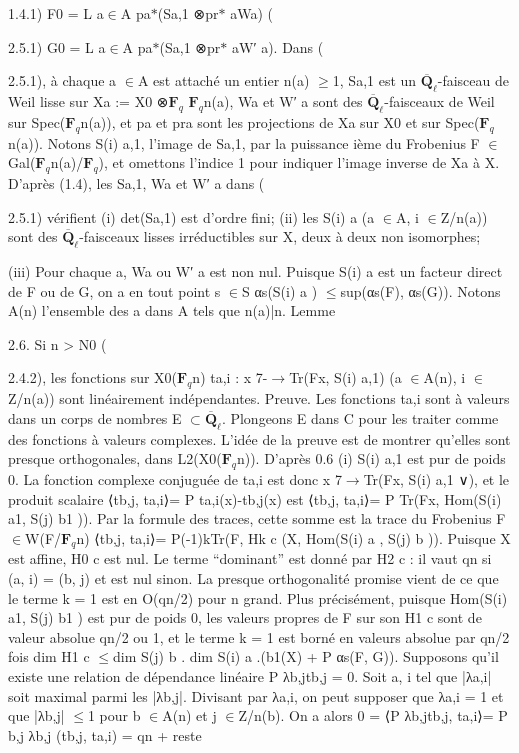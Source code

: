 \documentclass[11pt]{article}
\begin{document}
1.4.1) F0 = L a\(\in\)A pa\(*\)(Sa,1 ⊗pr\(*\) aWa) (

2.5.1) G0 = L a\(\in\)A pa\(*\)(Sa,1 ⊗pr\(*\) aW′ a). Dans (

2.5.1), à chaque a \(\in\)A est attaché un entier n(a) \(\ge\)1, Sa,1 est un \(\overline{\mathbf Q}_\ell\)-faisceau de Weil lisse sur Xa := X0 ⊗\(\mathbf F_q\) \(\mathbf F_q\)n(a), Wa et W′ a sont des \(\overline{\mathbf Q}_\ell\)-faisceaux de Weil sur Spec(\(\mathbf F_q\)n(a)), et pa et pra sont les projections de Xa sur X0 et sur Spec(\(\mathbf F_q\)n(a)). Notons S(i) a,1, l’image de Sa,1, par la puissance ième du Frobenius F \(\in\)Gal(\(\mathbf F_q\)n(a)/\(\mathbf F_q\)), et omettons l’indice 1 pour indiquer l’image inverse de Xa à X. D’après (1.4), les Sa,1, Wa et W′ a dans (

2.5.1) vérifient (i) det(Sa,1) est d’ordre fini; (ii) les S(i) a (a \(\in\)A, i \(\in\)Z/n(a)) sont des \(\overline{\mathbf Q}_\ell\)-faisceaux lisses irréductibles sur X, deux à deux non isomorphes;

(iii) Pour chaque a, Wa ou W′ a est non nul. Puisque S(i) a est un facteur direct de F ou de G, on a en tout point s \(\in\)S αs(S(i) a ) \(\le\)sup(αs(F), αs(G)). Notons A(n) l’ensemble des a dans A tels que n(a)|n. Lemme 

2.6. Si n > N0 (

2.4.2), les fonctions sur X0(\(\mathbf F_q\)n) ta,i : x 7-\(\to\)Tr(Fx, S(i) a,1) (a \(\in\)A(n), i \(\in\)Z/n(a)) sont linéairement indépendantes. Preuve. Les fonctions ta,i sont à valeurs dans un corps de nombres E \(\subset\)\(\overline{\mathbf Q}_\ell\). Plongeons E dans C pour les traiter comme des fonctions à valeurs complexes. L’idée de la preuve est de montrer qu’elles sont presque orthogonales, dans L2(X0(\(\mathbf F_q\)n)). D’après 0.6 (i) S(i) a,1 est pur de poids 0. La fonction complexe conjuguée de ta,i est donc x 7\(\to\)Tr(Fx, S(i) a,1 ∨), et le produit scalaire ⟨tb,j, ta,i⟩= P ta,i(x)-tb,j(x) est ⟨tb,j, ta,i⟩= P Tr(Fx, Hom(S(i) a1, S(j) b1 )). Par la formule des traces, cette somme est la trace du Frobenius F \(\in\)W(F/\(\mathbf F_q\)n) ⟨tb,j, ta,i⟩= P(-1)kTr(F, Hk c (X, Hom(S(i) a , S(j) b )). Puisque X est affine, H0 c est nul. Le terme “dominant” est donné par H2 c : il vaut qn si (a, i) = (b, j) et est nul sinon. La presque orthogonalité promise vient de ce que le terme k = 1 est en O(qn/2) pour n grand. Plus précisément, puisque Hom(S(i) a1, S(j) b1 ) est pur de poids 0, les valeurs propres de F sur son H1 c sont de valeur absolue qn/2 ou 1, et le terme k = 1 est borné en valeurs absolue par qn/2 fois dim H1 c \(\le\)dim S(j) b . dim S(i) a .(b1(X) + P αs(F, G)). Supposons qu’il existe une relation de dépendance linéaire P λb,jtb,j = 0. Soit a, i tel que |λa,i| soit maximal parmi les |λb,j|. Divisant par λa,i, on peut supposer que λa,i = 1 et que |λb,j| \(\le\)1 pour b \(\in\)A(n) et j \(\in\)Z/n(b). On a alors 0 = ⟨P λb,jtb,j, ta,i⟩= P b,j λb,j (tb,j, ta,i) = qn + reste
\end{document}
